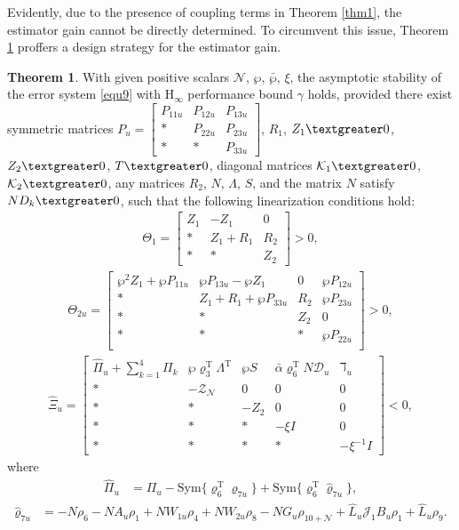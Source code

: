 \documentclass[preprint,review,fleqn,sort&compress,3p]{elsarticle}
\theoremstyle{definition}%
\newtheorem{thm}{Theorem}[section]
\begin{document}
Evidently, due to the presence of coupling terms in Theorem \ref{thm1}, the estimator gain cannot be directly determined. To circumvent this issue, Theorem \ref{thm2} proffers a design strategy for the estimator gain.
\begin{thm}\label{thm2}
		With given positive scalars  $\mathcal{N}$, $ \wp$, $\bar{\wp}$, $\xi $, the asymptotic stability of the error system \eqref{equ9} with $ \text{H}_{\infty} $ performance bound $\gamma$ holds, provided there exist symmetric matrices $P_u=\begin{bmatrix}
		P_{11u} & P_{12u} & P_{13u} \\
		* & P_{22u} & P_{23u} \\
		* & * & P_{33u}
	\end{bmatrix}$, $R_1$, $Z_1 \textgreater 0$, $Z_2 \textgreater 0$, $T \textgreater 0 $, diagonal matrices $\mathcal{K}_1 \textgreater 0$, $\mathcal{K}_2 \textgreater 0$, any matrices  $R_2$, $N$, $\Lambda$, $S$, and the matrix $N$ satisfy $N D_k \textgreater 0$, such that the following linearization conditions hold:
	\begin{align}\label{equ45}
		\Theta_1 = \begin{bmatrix}
			Z_1 & -Z_1 & 0 \\
			* & Z_1 + R_1 &  R_2 \\
			* & * & Z_2
		\end{bmatrix} > 0,
	\end{align}
	\begin{align}\label{equ46}
		\Theta_{2u} = \begin{bmatrix}
			\wp^2 Z_1 + \wp P_{11u} & \wp P_{13u} - \wp Z_1 & 0 & \wp P_{12u} \\
			* & Z_1 + R_1 + \wp P_{33u} & R_2 & \wp P_{23u} \\
			* & *& Z_2 & 0 \\
			* & * & * & \wp P_{22u} \\
		\end{bmatrix} > 0,
	\end{align}
	\begin{align}\label{equ47}
		\hat{\Xi}_u = \begin{bmatrix}
			\hat{\Pi}_u+\sum_{k=1}^4 \Pi_k & \wp\varrho^\text{T}_3 \Lambda^\text{T} & \wp S & \bar{\alpha}\varrho_6^\text{T} N \mathcal{D}_u & \daleth_u\\
			* & -\mathcal{Z}_\mathcal{N} & 0 & 0 &0 \\
			* & * & -Z_2 & 0 & 0\\
			* & * &* & -\xi I & 0\\
			* & * &* & * & -\xi^{-1} I
		\end{bmatrix} < 0,
	\end{align}
	where
	\begin{align*}
		\hat{\Pi}_u&=\Pi_u - \text{Sym} \{\varrho_6^\text{T} \varrho_{7u} \} + \text{Sym} \{\varrho_6^\text{T} \hat{\varrho}_{7u} \}, 
	\end{align*}
	\begin{align*}
		\hat{\varrho}_{7u} &=-N \rho_6 - N A_u \rho_1 + N W_{1u} \rho_4 + N W_{2u} \rho_8 - N G_u \rho_{10+\mathcal{N}} + \hat{L}_u \mathcal{J}_1 B_u \rho_1 + \hat{L}_u \rho_9.
	\end{align*}
	

\end{thm}
\end{document}

